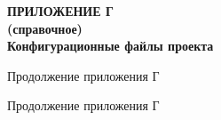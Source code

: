   \newpage
  
  \begin{center}
  \textbf{
  \MakeUppercase{Приложение Г}\\
  (справочное)\\
  \vspace{1em}
  Конфигурационные файлы проекта}
  \end{center}
  
  
  \newpage
  \begin{center}
    Продолжение приложения Г
  \end{center}
  
  \begin{center}
    Продолжение приложения Г
  \end{center}
  